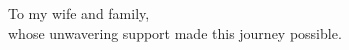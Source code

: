 
\begin{dedicatoria}
To my wife and family,\\
whose unwavering support made this journey possible.
\end{dedicatoria}
